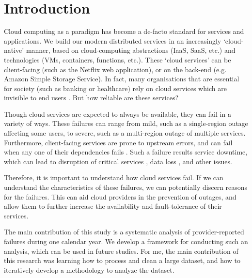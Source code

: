 \section{Introduction}
Cloud computing as a paradigm has become a de-facto standard for services and applications.
We build our modern distributed services in an increasingly `cloud-native' manner, based on cloud-computing abstractions (IaaS, SaaS, etc.) and technologies (VMs, containers, functions, etc.).
These `cloud services' can be client-facing (such as the Netflix web application), or on the back-end (e.g. Amazon Simple Storage Service).
In fact, many organisations that are essential for society (such as banking or healthcare) rely on cloud services which are invisible to end users \cite{armbrust2010,dean2015}.
But how reliable are these services?

Though cloud services are expected to always be available, they can fail in a variety of ways.
These failures can range from mild, such as a single-region outage affecting some users, to severe, such as a multi-region outage of multiple services.
Furthermore, client-facing services are prone to upstream errors, and can fail when any one of their dependencies fails \cite{steen2016}.
Such a failure results service downtime, which can lead to disruption of critical services \cite{emergencyOnCloud,healthcareCrash}, data loss \cite{tencentDataLoss}, and other issues.

Therefore, it is important to understand how cloud services fail.
If we can understand the characteristics of these failures, we can potentially discern reasons for the failures.
This can aid cloud providers in the prevention of outages, and allow them to further increase the availability and fault-tolerance of their services.


The main contribution of this study is a systematic analysis of provider-reported failures during one calendar year.
We develop a framework for conducting such an analysis, which can be used in future studies.
For me, the main contribution of this research was learning how to process and clean a large dataset, and how to iteratively develop a methodology to analyze the dataset.
